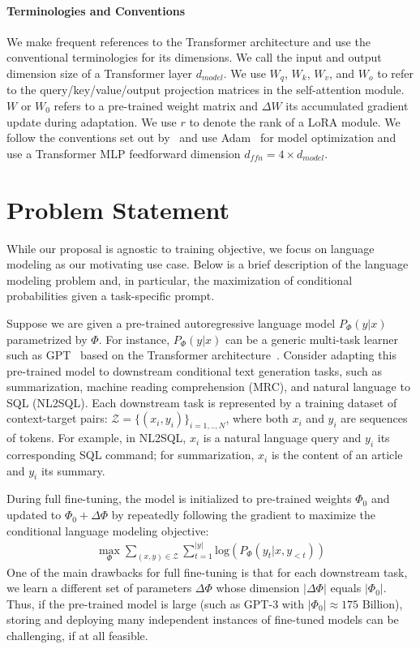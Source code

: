 \documentclass{article} %
\begin{document}
\paragraph{Terminologies and Conventions}
We make frequent references to the Transformer architecture and use the conventional terminologies for its dimensions.
We call the input and output dimension size of a Transformer layer $d_{model}$.
We use $W_q$, $W_k$, $W_v$, and $W_o$ to refer to the query/key/value/output projection matrices in the self-attention module.
$W$ or $W_0$ refers to a pre-trained weight matrix and $\Delta W$ its accumulated gradient update during adaptation.
We use $r$ to denote the rank of a LoRA module.
We follow the conventions set out by~\citep{vaswani2017attention, brown_language_2020} and use Adam~\citep{loshchilov2019decoupled, kingma2017adam} for model optimization and use a Transformer MLP feedforward dimension $d_{ffn} = 4 \times d_{model}$.

\section{Problem Statement}
\label{sec:problem_statement}
While our proposal is agnostic to training objective, we focus on language modeling as our motivating use case.
Below is a brief description of the language modeling problem and, in particular, the maximization of conditional probabilities given a task-specific prompt.

\newcommand{\cZ}{\mathcal{Z}}
Suppose we are given a pre-trained autoregressive language model $P_\Phi(y|x)$ parametrized by $\Phi$.
For instance, $P_\Phi(y|x)$ can be a generic multi-task learner such as GPT~\citep{radford_language_nodate,brown_language_2020} based on the Transformer architecture~\citep{vaswani2017attention}.
Consider adapting this pre-trained model to downstream conditional text generation tasks, such as summarization, machine reading comprehension (MRC), and natural language to SQL (NL2SQL).
Each downstream task is represented by a training dataset of context-target pairs: $\mathcal{Z} = \{(x_i, y_i)\}_{i=1,..,N}$, where both $x_i$ and $y_i$ are sequences of tokens.
For example, in NL2SQL, $x_i$ is a natural language query and $y_i$ its corresponding SQL command; for summarization, $x_i$ is the content of an article and $y_i$ its summary.

During full fine-tuning, the model is initialized to pre-trained weights $\Phi_0$ and updated to $\Phi_0+\Delta \Phi$ by repeatedly following the gradient to maximize the conditional language modeling objective:
\begin{align}
    \max_{\Phi} \sum_{(x,y)\in\mathcal{Z}} \sum_{t=1}^{|y|}  \text{log} \left(  P_{\Phi}(y_{t} | x, y_{<t}) \right)
\label{eq:ft_obj}
\end{align}
One of the main drawbacks for full fine-tuning is that for each downstream task, we learn a different set of parameters $\Delta\Phi$ whose dimension $|\Delta\Phi|$ equals $|\Phi_0|$.
Thus, if the pre-trained model is large (such as GPT-3 with $|\Phi_0|\approx175 \text{~Billion}$), storing and deploying many independent instances of fine-tuned models can be challenging, if at all feasible.
\end{document}
